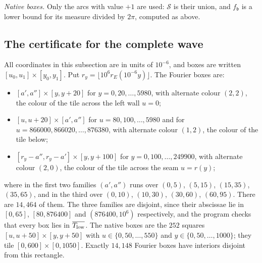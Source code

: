 \documentclass[11pt,colorlinks]{charlie}
\begin{document}
\emph{Native boxes.} Only the arcs with value $+1$ are used: $\mathcal S$ is their union, and $f_{\mathfrak b}$ is a lower bound for its measure divided by $2\pi$, computed as above.

\subsection{The certificate for the complete wave}\label{sec:starE}
All coordinates in this subsection are in units of $10^{-6}$, and boxes are written $[u_0,u_1]\times[y_0,y_1]$. Put $r_y=\lfloor10^6r_E(10^{-6}y)\rfloor$. The Fourier boxes are:
\begin{itemize}
\item $[a',a'']\times[y,y+20]$ for $y=0,20,\dots,5980$, with alternate colour $(2,2)$, the colour of the tile across the left wall $u=0$;
\item $[u,u+20]\times[a',a'']$ for $u=80,100,\dots,5980$ and for $u=866000,866020,\dots,876380$, with alternate colour $(1,2)$, the colour of the tile below;
\item $[r_y-a'',r_y-a']\times[y,y+100]$ for $y=0,100,\dots,249900$, with alternate colour $(2,0)$, the colour of the tile across the seam $u=r(y)$;
\end{itemize}
where in the first two families $(a',a'')$ runs over $(0,5)$, $(5,15)$, $(15,35)$, $(35,65)$, and in the third over $(0,10)$, $(10,30)$, $(30,60)$, $(60,95)$. There are $14{,}464$ of them. The three families are disjoint, since their abscissae lie in $[0,65]$, $[80,876400]$ and $(876400,10^6)$ respectively, and the program checks that every box lies in $\overline{T_{\rm low}}$. The native boxes are the $252$ squares $[u,u+50]\times[y,y+50]$ with $u\in\{0,50,\dots,550\}$ and $y\in\{0,50,\dots,1000\}$; they tile $[0,600]\times[0,1050]$. Exactly $14{,}148$ Fourier boxes have interiors disjoint from this rectangle.
\end{document}
